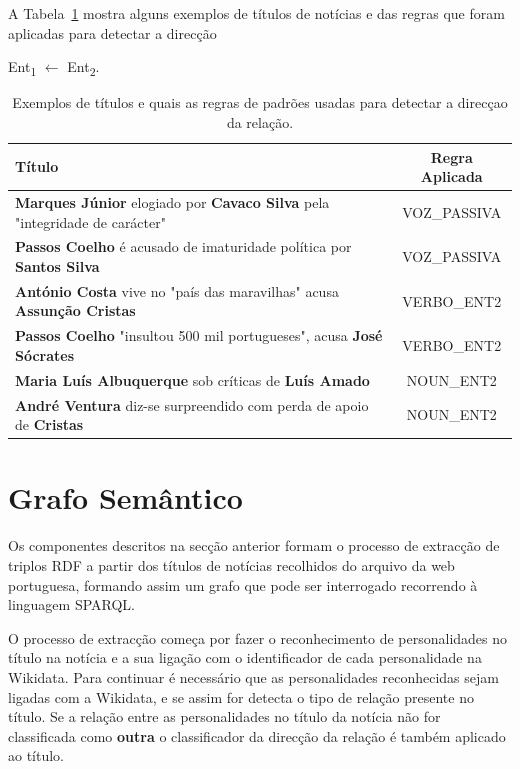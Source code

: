 \documentclass[a4paper, twocolumn, 11pt, twoside]{article}
\begin{document}
A Tabela~\ref{tab:examples_patterns_direction} mostra alguns exemplos de títulos de notícias e das regras que foram aplicadas para detectar a direcção {Ent\textsubscript{1} $\leftarrow$ Ent\textsubscript{2}.

\begin{table}[!ht]
  \centering
  \begin{tabular}{lc}
      {\bf Título} & {\bf Regra Aplicada} \\
      \hline
	  \textbf{Marques Júnior} elogiado por \textbf{Cavaco Silva} pela "integridade de carácter" & VOZ\_PASSIVA \\
	  \textbf{Passos Coelho} é acusado de imaturidade política por \textbf{Santos Silva}  		& VOZ\_PASSIVA \\
	  \textbf{António Costa} vive no "país das maravilhas" acusa \textbf{Assunção Cristas}      & VERBO\_ENT2 \\
	  \textbf{Passos Coelho} "insultou 500 mil portugueses", acusa \textbf{José Sócrates}		& VERBO\_ENT2 \\ 
	  \textbf{Maria Luís Albuquerque} sob críticas de \textbf{Luís Amado}						& NOUN\_ENT2 \\
	  \textbf{André Ventura} diz-se surpreendido com perda de apoio de \textbf{Cristas}			& NOUN\_ENT2 \\

	  \hline
  \end{tabular}
  \caption{Exemplos de títulos e quais as regras de padrões usadas para detectar a direcçao da relação.}
  \label{tab:examples_patterns_direction}
\end{table}


\section{Grafo Semântico}
\label{sec:pipeline}


Os componentes descritos na secção anterior formam o processo de extracção de triplos RDF a partir dos títulos de notícias recolhidos do arquivo da web portuguesa, formando assim um grafo que pode ser interrogado recorrendo à linguagem SPARQL.

O processo de extracção começa por fazer o reconhecimento de personalidades no título na notícia e a sua ligação com o identificador de cada personalidade na Wikidata. Para continuar é necessário que as personalidades reconhecidas sejam ligadas com a Wikidata, e se assim for detecta o tipo de relação presente no título.  Se a relação entre as personalidades no título da notícia não for classificada como \textbf{outra} o classificador da direcção da relação é também aplicado ao título. 

}
\end{document}
